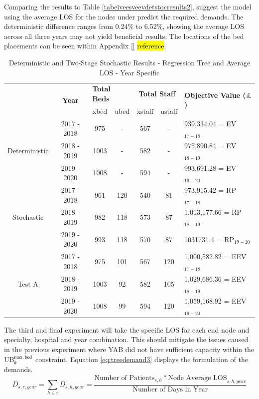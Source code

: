\documentclass[../thesis.tex]{subfiles}
\begin{document}
Comparing the results to Table \ref{tabeiveesveevdetstocresults2}, suggest the model using the average LOS for the nodes under predict the required demands. The deterministic difference ranges from 0.24\% to 6.52\%, showing the average LOS across all three years may not yield beneficial results. The locations of the bed placements can be seen within Appendix \ref{} \hl{reference}.



\begin{table}[h!]
    \centering
    \begin{tabular}{ccccccl}\toprule
 & \multirow{2}{*}{\textbf{Year}}& \multicolumn{2}{l}{\textbf{Total Beds}} & \multicolumn{2}{c}{\textbf{Total Staff}} & \multirow{2}{*}{\textbf{Objective Value ($\pounds$)}}\\ \cmidrule(lr){3-4} \cmidrule(lr){5-6}
&& xbed           & ubed          & xstaff         & ustaff         \\ \midrule
     \multirow{3}{*}{Deterministic} & 2017 - 2018 & 975  & - & 567  & - &  939,334.04 =  EV$_{17-18}$ \\ 
      & 2018 - 2019 &1003 & - & 582 & - & 975,890.84 =  EV$_{18-19}$ \\
      & 2019 - 2020 & 1008 & - & 594 & - &  993,691.28 =  EV$_{19-20}$\\ \midrule
     \multirow{3}{*}{Stochastic} & 2017 - 2018 & 961 & 120 & 540 & 81 & 973,915.42 =  RP$_{17-18}$ \\ 
      & 2018 - 2019 & 982 &  118 & 573 & 87 & 1,013,177.66 =  RP$_{18-19}$ \\
      & 2019 - 2020 &993 & 118 &570 &87 & 1031731.4 =  RP$_{19-20}$\\ \midrule    
     \multirow{3}{*}{Test A} & 2017 - 2018 & 975 & 101 &  567 & 120 & 1,000,582.82
=  EEV$_{17-18}$ \\ 
      & 2018 - 2019& 1003 & 92& 582 & 105 &1,029,686.36 =  EEV$_{18-19}$ \\
      & 2019 - 2020 & 1008 & 99 & 594 &120 & 1,059,168.92 =  EEV$_{19-20}$\\ \bottomrule       
    \end{tabular}
    \caption{Deterministic and Two-Stage Stochastic Results - Regression Tree and Average LOS - Year Specific}
    \label{tab:Results2}
\end{table}



The third and final experiment will take the specific LOS for each end node and specialty, hospital and year combination. This should mitigate the issues caused in the previous experiment where YAB did not have sufficient capacity within the UB$_{h}^{\textnormal{max, bed}}$ constraint. Equation \eqref{eq:treedemand3} displays the formulation of the demands.
\begin{equation}\label{eq:treedemand3}
        D_{s,r,year} = \sum\limits_{h \in r} D_{s,h,year} = \frac{\text{Number of Patients}_{s,h}*\text{Node Average LOS}_{s,h,year}}{\text{Number of Days in Year}}
\end{equation}
\end{document}
